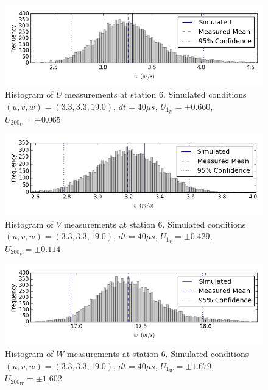 \begin{figure}[H]
\centering
\includegraphics[width=6in]{figs/Ely_May28th06002/uncertainty_Ely_May28th06002_U}
\caption{Histogram of $U$ measurements at station 6. Simulated conditions $(u,v,w)=(3.3, 3.3, 19.0)$, $dt=40 \mu s$, $U_1_U=\pm 0.660$, $U_200_U=\pm 0.065$}
\label{fig:uncertainty_Ely_May28th06002_U}
\end{figure}


\begin{figure}[H]
\centering
\includegraphics[width=6in]{figs/Ely_May28th06002/uncertainty_Ely_May28th06002_V}
\caption{Histogram of $V$ measurements at station 6. Simulated conditions $(u,v,w)=(3.3, 3.3, 19.0)$, $dt=40 \mu s$, $U_1_V=\pm 0.429$, $U_200_V=\pm 0.114$}
\label{fig:uncertainty_Ely_May28th06002_V}
\end{figure}


\begin{figure}[H]
\centering
\includegraphics[width=6in]{figs/Ely_May28th06002/uncertainty_Ely_May28th06002_W}
\caption{Histogram of $W$ measurements at station 6. Simulated conditions $(u,v,w)=(3.3, 3.3, 19.0)$, $dt=40 \mu s$, $U_1_W=\pm 1.679$, $U_200_W=\pm 1.602$}
\label{fig:uncertainty_Ely_May28th06002_W}
\end{figure}


